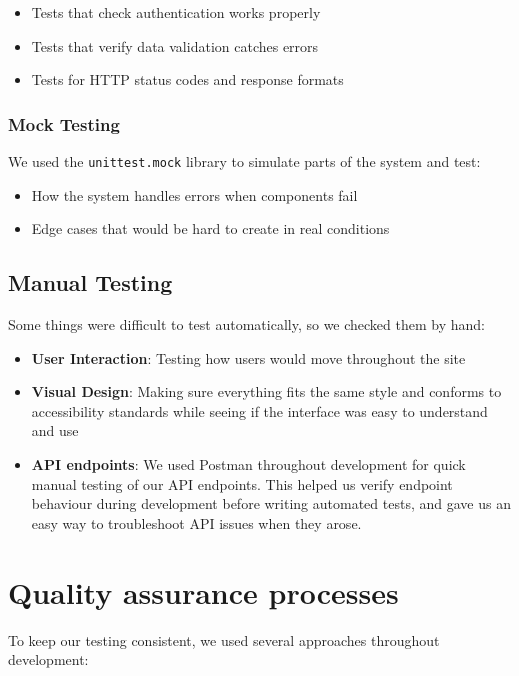\begin{itemize}
    \item Tests that check authentication works properly
    \item Tests that verify data validation catches errors
    \item Tests for HTTP status codes and response formats
\end{itemize}

\subsubsection{Mock Testing}
We used the \texttt{unittest.mock} library to simulate parts of the system and test:

\begin{itemize}
    \item How the system handles errors when components fail
    \item Edge cases that would be hard to create in real conditions
\end{itemize}


\subsection{Manual Testing}

Some things were difficult to test automatically, so we checked them by hand:

\begin{itemize}
    \item \textbf{User Interaction}: Testing how users would move throughout the site
    \item \textbf{Visual Design}: Making sure everything fits the same style and conforms to accessibility standards while seeing if the interface was easy to understand and use
    \item \textbf{API endpoints}: We used Postman throughout development for quick manual testing of our API endpoints. This helped us verify endpoint behaviour during development before writing automated tests, and gave us an easy way to troubleshoot API issues when they arose.
\end{itemize}

\section{Quality assurance processes}
\label{sect:testing:process}

To keep our testing consistent, we used several approaches throughout development:

